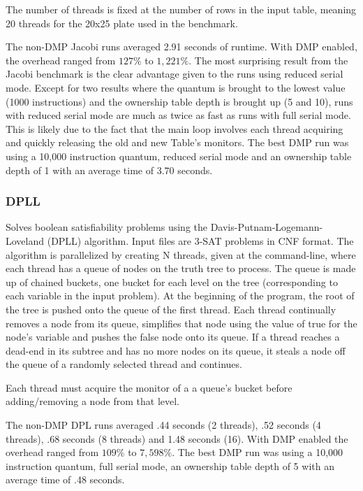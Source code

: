 The number of threads is fixed at the number of rows in the input
table, meaning 20 threads for the 20x25 plate used in the benchmark.

The non-DMP Jacobi runs averaged 2.91 seconds of runtime.  With DMP
enabled, the overhead ranged from $127\%$ to $1,221\%$.  The most
surprising result from the Jacobi benchmark is the clear advantage
given to the runs using reduced serial mode.  Except for two results
where the quantum is brought to the lowest value (1000 instructions)
and the ownership table depth is brought up (5 and 10), runs with
reduced serial mode are much as twice as fast as runs with full serial
mode.  This is likely due to the fact that the main loop involves each
thread acquiring and quickly releasing the old and new Table's
monitors.  The best DMP run was using a 10,000 instruction quantum,
reduced serial mode and an ownership table depth of 1 with an average
time of 3.70 seconds.

\subsubsection{DPLL}

Solves boolean satisfiability problems using the
Davis-Putnam-Logemann-Loveland (DPLL) algorithm.  Input files are
3-SAT problems in CNF format.  The algorithm is parallelized by
creating N threads, given at the command-line, where each thread has a
queue of nodes on the truth tree to process.  The queue is made up of
chained buckets, one bucket for each level on the tree (corresponding
to each variable in the input problem).  At the beginning of the
program, the root of the tree is pushed onto the queue of the first
thread.  Each thread continually removes a node from its queue,
simplifies that node using the value of true for the node's variable
and pushes the false node onto its queue.  If a thread reaches a
dead-end in its subtree and has no more nodes on its queue, it steals
a node off the queue of a randomly selected thread and continues.

Each thread must acquire the monitor of a a queue's bucket before
adding/removing a node from that level.

The non-DMP DPL runs averaged .44 seconds (2 threads), .52 seconds (4
threads), .68 seconds (8 threads) and 1.48 seconds (16).  With DMP
enabled the overhead ranged from $109\%$ to $7,598\%$.  The best DMP
run was using a 10,000 instruction quantum, full serial mode, an
ownership table depth of 5 with an average time of .48 seconds.

